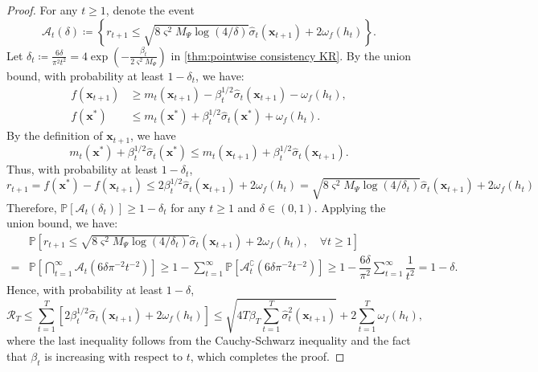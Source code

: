 \documentclass[11pt,en]{elegantpaper}
\newcommand{\x}{\bm{x}}
\newcommand{\cumregret}{\mathcal{R}}
\newcommand{\1}{\mathds{1}}
\newcommand{\set}[1]{\left\{#1\right\}}
\begin{document}
\begin{proof}
    For any $t \ge 1$, denote the event
    \[
        \mathcal{A}_t(\delta) \coloneqq \set{r_{t+1} \le \sqrt{8 \varsigma^2 M_{\Psi} \log(4 / \delta)} \widehat{\sigma}_t(\x_{t+1}) + 2 \omega_f(h_t)}.
    \]
    Let $\delta_t \coloneqq \frac{6\delta}{\pi^2 t^2} =  4\exp\left(-\frac{\beta_t}{2 \varsigma^2 M_{\Psi}}\right)$ in \cref{thm:pointwise consistency KR}. By the union bound, with probability at least $1 - \delta_t$, we have:
    \begin{align*}
        f(\x_{t+1}) & \ge m_t(\x_{t+1}) - \beta_t^{1/2} \widehat{\sigma}_t(\x_{t+1}) - \omega_f(h_t), 
        \\
        f(\x^{\ast}) & \le m_t(\x^{\ast}) + \beta_t^{1/2} \widehat{\sigma}_t(\x^{\ast}) + \omega_f(h_t).
    \end{align*}
    By the definition of $\x_{t+1}$, we have
    \[
        m_t(\x^{\ast}) + \beta_t^{1/2} \widehat{\sigma}_t(\x^{\ast})
        \le m_t(\x_{t+1}) + \beta_t^{1/2} \widehat{\sigma}_t(\x_{t+1}).
    \]
    Thus, with probability at least $1 - \delta_t$,
    \[
        r_{t+1} = f(\x^{\ast}) - f(\x_{t+1}) \le 2\beta_t^{1/2}\widehat{\sigma}_t(\x_{t+1})+2\omega_f(h_t)=\sqrt{8 \varsigma^2 M_{\Psi} \log(4 / \delta_t)} \widehat{\sigma}_t(\x_{t+1}) + 2 \omega_f(h_t)
    \]
    Therefore, $\mathbb{P}[\mathcal{A}_t(\delta_t)] \ge 1 - \delta_t$ for any $t \ge 1$ and $\delta \in (0, 1)$. Applying the union bound, we have:
    \begin{align*}
        & \mathbb{P} \left[ r_{t+1} \le \sqrt{8 \varsigma^2 M_{\Psi} \log(4 / \delta_t)} \widehat{\sigma}_t(\x_{t+1}) + 2 \omega_f(h_t), \quad \forall t \ge 1 \right] 
        \\
        = & \mathbb{P} \left[ \bigcap_{t=1}^{\infty} \mathcal{A}_t(6\delta \pi^{-2}  t^{-2}) \right]
        \ge 1 - \sum_{t=1}^{\infty} \mathbb{P} \left[ \mathcal{A}^{\complement}_t(6 \delta\pi^{-2}  t^{-2}) \right]
        \ge 1 - \dfrac{6 \delta}{\pi^2} \sum_{t=1}^{\infty} \dfrac{1}{t^2}
        = 1 - \delta.
    \end{align*}
    Hence, with probability at least $1 - \delta$,
    \[
        \cumregret_T
        \le \sum_{t=1}^{T} \left[ 2 \beta_t^{1/2} \widehat{\sigma}_t(\x_{t+1}) + 2 \omega_f(h_t) \right]
        \le \sqrt{4 T \beta_T \sum_{t=1}^{T} \widehat{\sigma}_t^2(\x_{t+1})} + 2 \sum_{t=1}^{T} \omega_f(h_t),
    \]
    where the last inequality follows from the Cauchy-Schwarz inequality and the fact that $\beta_t$ is increasing with respect to $t$, which completes the proof.
\end{proof}
\end{document}
